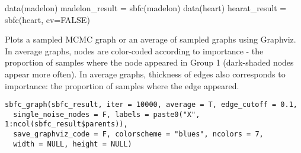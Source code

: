 \documentclass[a4paper]{book}
\begin{document}
%
\begin{Examples}
\begin{ExampleCode}
data(madelon)
madelon_result = sbfc(madelon)
data(heart)
hearat_result = sbfc(heart, cv=FALSE)
\end{ExampleCode}
\end{Examples}
%
\begin{Description}\relax
Plots a sampled MCMC graph or an average of sampled graphs using Graphviz. \\{}
In average graphs, nodes are color-coded according to importance - the proportion of samples where the node appeared in Group 1 (dark-shaded nodes appear more often).
In average graphs, thickness of edges also corresponds to importance: the proportion of samples where the edge appeared.
\end{Description}
%
\begin{Usage}
\begin{verbatim}
sbfc_graph(sbfc_result, iter = 10000, average = T, edge_cutoff = 0.1,
  single_noise_nodes = F, labels = paste0("X", 1:ncol(sbfc_result$parents)),
  save_graphviz_code = F, colorscheme = "blues", ncolors = 7,
  width = NULL, height = NULL)
\end{verbatim}
\end{Usage}
%
\end{document}
